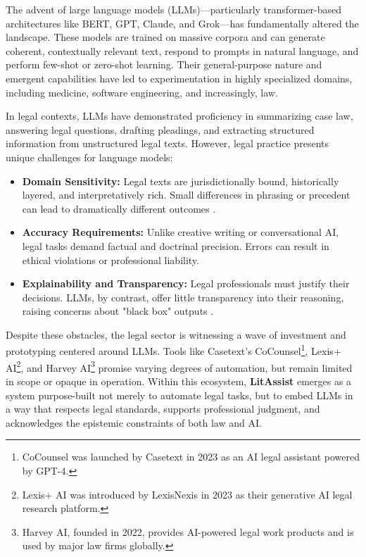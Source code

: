 \documentclass[12pt,a4paper]{article}
\begin{document}
The advent of large language models (LLMs)—particularly transformer-based architectures like BERT, GPT, Claude, and Grok—has fundamentally altered the landscape. These models are trained on massive corpora and can generate coherent, contextually relevant text, respond to prompts in natural language, and perform few-shot or zero-shot learning. Their general-purpose nature and emergent capabilities have led to experimentation in highly specialized domains, including medicine, software engineering, and increasingly, law.

In legal contexts, LLMs have demonstrated proficiency in summarizing case law, answering legal questions, drafting pleadings, and extracting structured information from unstructured legal texts. However, legal practice presents unique challenges for language models:

\begin{itemize}
\item \textbf{Domain Sensitivity:} Legal texts are jurisdictionally bound, historically layered, and interpretatively rich. Small differences in phrasing or precedent can lead to dramatically different outcomes \cite{Gordon2007}.

\item \textbf{Accuracy Requirements:} Unlike creative writing or conversational AI, legal tasks demand factual and doctrinal precision. Errors can result in ethical violations or professional liability.

\item \textbf{Explainability and Transparency:} Legal professionals must justify their decisions. LLMs, by contrast, offer little transparency into their reasoning, raising concerns about "black box" outputs \cite{Wischmeyer2020}.
\end{itemize}

Despite these obstacles, the legal sector is witnessing a wave of investment and prototyping centered around LLMs. Tools like Casetext's CoCounsel\footnote{CoCounsel was launched by Casetext in 2023 as an AI legal assistant powered by GPT-4.}, Lexis+ AI\footnote{Lexis+ AI was introduced by LexisNexis in 2023 as their generative AI legal research platform.}, and Harvey AI\footnote{Harvey AI, founded in 2022, provides AI-powered legal work products and is used by major law firms globally.} promise varying degrees of automation, but remain limited in scope or opaque in operation. Within this ecosystem, \textbf{LitAssist} emerges as a system purpose-built not merely to automate legal tasks, but to embed LLMs in a way that respects legal standards, supports professional judgment, and acknowledges the epistemic constraints of both law and AI.
\end{document}
